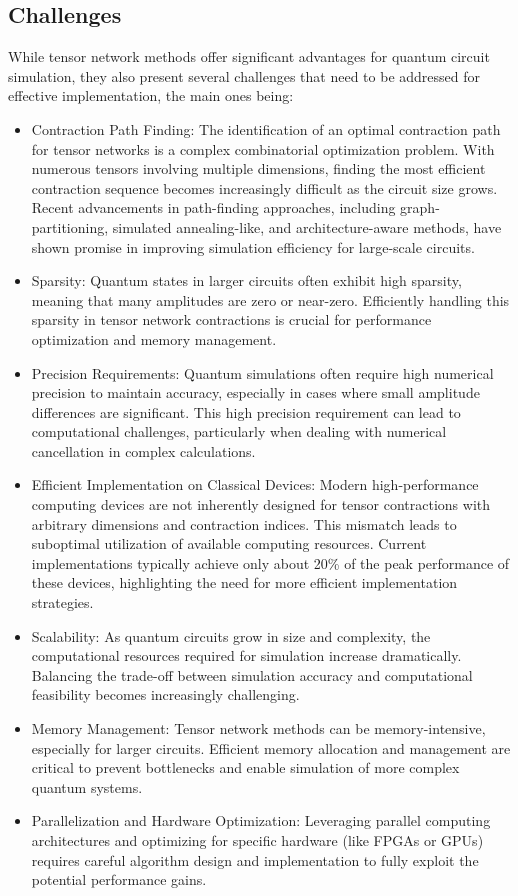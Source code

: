 \documentclass[12pt,oneside,a4paper]{article}
\begin{document}
\subsection{Challenges}
While tensor network methods offer significant advantages for quantum circuit simulation, they also present several challenges that need to be addressed for effective implementation, the main ones being:
\begin{itemize}
    \item Contraction Path Finding: The identification of an optimal contraction path for tensor networks is a complex combinatorial optimization problem. With numerous tensors involving multiple dimensions, finding the most efficient contraction sequence becomes increasingly difficult as the circuit size grows. Recent advancements in path-finding approaches, including graph-partitioning, simulated annealing-like, and architecture-aware methods, have shown promise in improving simulation efficiency for large-scale circuits.
    \item Sparsity: Quantum states in larger circuits often exhibit high sparsity, meaning that many amplitudes are zero or near-zero. Efficiently handling this sparsity in tensor network contractions is crucial for performance optimization and memory management.
    \item Precision Requirements: Quantum simulations often require high numerical precision to maintain accuracy, especially in cases where small amplitude differences are significant. This high precision requirement can lead to computational challenges, particularly when dealing with numerical cancellation in complex calculations.
    \item Efficient Implementation on Classical Devices: Modern high-performance computing devices are not inherently designed for tensor contractions with arbitrary dimensions and contraction indices. This mismatch leads to suboptimal utilization of available computing resources. Current implementations typically achieve only about 20\% of the peak performance of these devices, highlighting the need for more efficient implementation strategies.
    \item Scalability: As quantum circuits grow in size and complexity, the computational resources required for simulation increase dramatically. Balancing the trade-off between simulation accuracy and computational feasibility becomes increasingly challenging.
    \item Memory Management: Tensor network methods can be memory-intensive, especially for larger circuits. Efficient memory allocation and management are critical to prevent bottlenecks and enable simulation of more complex quantum systems.
    \item Parallelization and Hardware Optimization: Leveraging parallel computing architectures and optimizing for specific hardware (like FPGAs or GPUs) requires careful algorithm design and implementation to fully exploit the potential performance gains.
\end{itemize}
\end{document}
